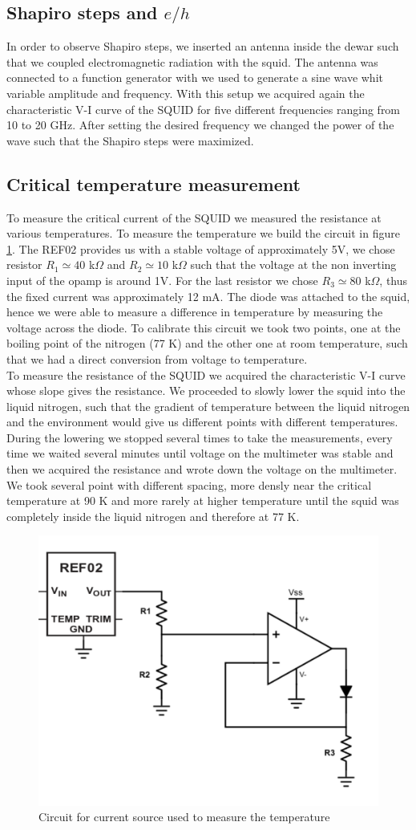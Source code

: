 \documentclass[a4paper,10pt]{article}
\begin{document}
\subsection{Shapiro steps and $e/h$}
In order to observe Shapiro steps, we inserted an antenna inside the dewar such that we coupled electromagnetic radiation with the squid. The antenna was connected to a function generator with we used to generate a sine wave whit variable amplitude and frequency. With this setup we acquired again the characteristic V-I curve of the SQUID for five different frequencies ranging from 10 to 20 GHz. After setting the desired frequency we changed the power of the wave such that the Shapiro steps were maximized.
\subsection{Critical temperature measurement}
To measure the critical current of the SQUID we measured the resistance at various temperatures. To measure the temperature we build the circuit in figure \ref{circuit}. The REF02 provides us with a stable voltage of approximately 5V, we chose resistor $R_1 \simeq 40$ k$\Omega$ and $R_2 \simeq 10$ k$\Omega$ such that the voltage at the non inverting input of the opamp is around 1V. For the last resistor  we chose $R_3 \simeq 80$ k$\Omega$, thus the fixed current was approximately 12 mA. The diode was attached to the squid, hence we were able to measure a difference in temperature by measuring the voltage across the diode. To calibrate this circuit we took two points, one at the boiling point of the nitrogen (77 K) and the other one at room temperature, such that we had a direct conversion from voltage to temperature.\\
To measure the resistance of the SQUID we acquired the characteristic V-I curve whose slope gives the resistance. We proceeded to slowly lower the squid into the liquid nitrogen, such that the gradient of temperature between the liquid nitrogen and the environment would give us different points with different temperatures. During the lowering we stopped several times to take the measurements, every time we waited several minutes until voltage on the multimeter was stable and then we acquired the resistance and wrote down the voltage on the multimeter.
We took several point with different spacing, more densly near the critical temperature at 90 K and more rarely at higher temperature until the squid was completely inside the liquid nitrogen and therefore at 77 K.
\begin{figure}[H]
\centering
\includegraphics[width = .5\textwidth]{circuit}
\caption{Circuit for current source used to measure the temperature}\label{circuit}
\end{figure}
\end{document}
